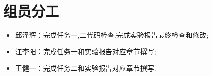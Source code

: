 \section{组员分工}
\begin{itemize}
    \item 邱泽辉：完成任务一,二代码检查;完成实验报告最终检查和修改;
    \item 江李阳：完成任务一和实验报告对应章节撰写;
    \item 王健一：完成任务二和实验报告对应章节撰写.
\end{itemize}